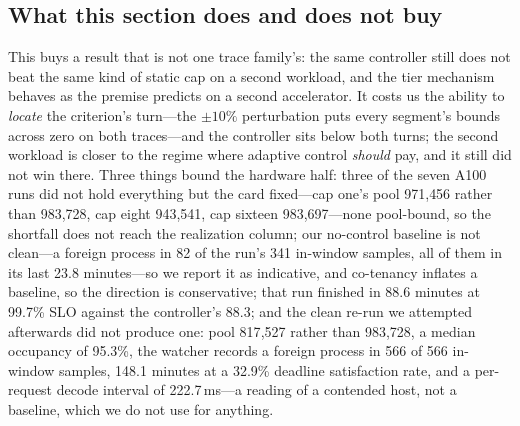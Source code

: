 \subsection{What this section does and does not buy}
\label{sec:a100:limits}

This buys a result that is not one trace family's: the same controller still does
not beat the same kind of static cap on a second workload, and the tier mechanism
behaves as the premise predicts on a second accelerator. It costs us the ability
to \emph{locate} the criterion's turn---the $\pm10\%$ perturbation puts every
segment's bounds across zero on both traces---and the controller sits below both
turns; the second workload is closer to the regime where adaptive control
\emph{should} pay, and it still did not win there. Three things bound the hardware
half: three of the seven A100 runs did not hold everything but the card fixed---cap
one's pool 971{,}456 rather than 983{,}728, cap eight 943{,}541, cap sixteen
983{,}697---none pool-bound, so the shortfall does not reach the realization
column; our no-control baseline is not clean---a foreign process in 82 of the
run's 341 in-window samples, all of them in its last 23.8 minutes---so we report
it as indicative, and co-tenancy inflates a baseline, so the direction is
conservative; that run finished in 88.6 minutes at 99.7\% SLO against the
controller's 88.3; and the clean re-run we attempted afterwards did not produce
one: pool 817{,}527 rather than 983{,}728, a median occupancy of 95.3\%, the
watcher records a foreign process in 566 of 566 in-window samples,
148.1 minutes at a 32.9\% deadline satisfaction rate, and a per-request decode
interval of
222.7\,ms---a reading of a contended host, not a baseline, which we do not use
for anything.
